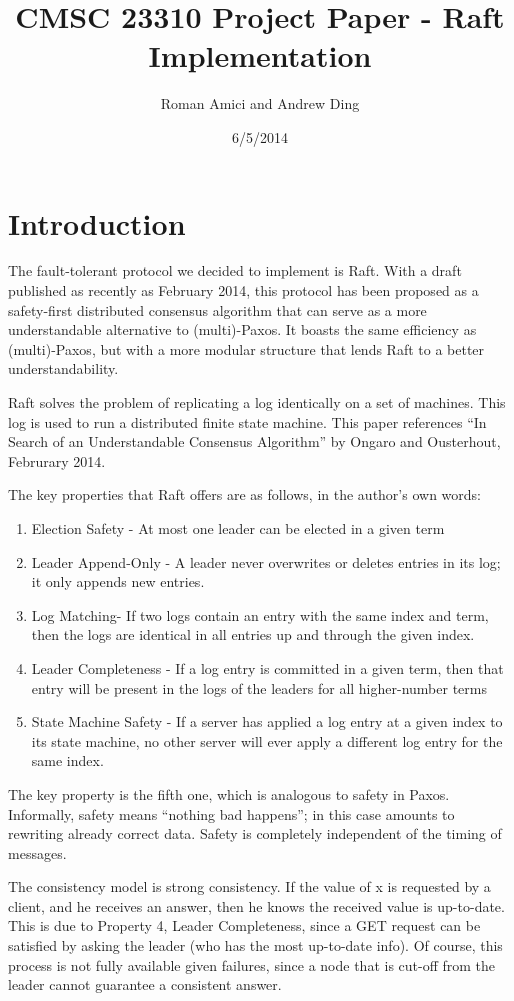 \documentclass{article}
\title{CMSC 23310 Project Paper - Raft Implementation}
\author{Roman Amici and Andrew Ding}
\date{6/5/2014}
\begin{document}
\maketitle

\section{Introduction}

The fault-tolerant protocol we decided to implement is Raft. With a draft published as recently as February 2014, this protocol has been proposed as a safety-first distributed consensus algorithm that can serve as a more understandable alternative to (multi)-Paxos. It boasts the same efficiency as (multi)-Paxos, but with a more modular structure that lends Raft to a better understandability.

Raft solves the problem of replicating a log identically on a set of machines. This log is used to run a distributed finite state machine. This paper references “In Search of an Understandable Consensus Algorithm” by Ongaro and Ousterhout, Februrary 2014.

The key properties that Raft offers are as follows, in the author’s own words:
\begin{enumerate}
\item Election Safety - At most one leader can be elected in a given term
\item Leader Append-Only - A leader never overwrites or deletes entries in its log; it only appends new entries.
\item Log Matching- If two logs contain an entry with the same index and term, then the logs are identical in all entries up and through the given index.
\item Leader Completeness - If a log entry is committed in a given term, then that entry will be present in the logs of the leaders for all higher-number terms
\item State Machine Safety - If a server has applied a log entry at a given index to its state machine, no other server will ever apply a different log entry for the same index.
\end{enumerate}
The key property is the fifth one, which is analogous to safety in Paxos. Informally, safety means “nothing bad happens”; in this case amounts to rewriting already correct data. Safety is completely independent of the timing of messages.

The consistency model is strong consistency. If the value of x is requested by a client, and he receives an answer, then he knows the received value is up-to-date. This is due to Property 4, Leader Completeness, since a GET request can be satisfied by asking the leader (who has the most up-to-date info). Of course, this process is not fully available given failures, since a node that is cut-off from the leader cannot guarantee a consistent answer.
\end{document}
